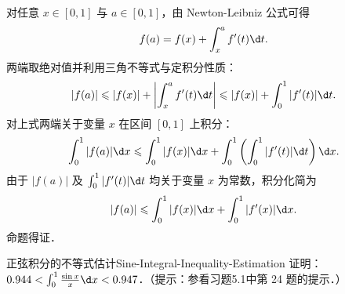 \begin{myproof}
    对任意 $x \in [0, 1]$ 与 $a \in [0, 1]$，由 Newton-Leibniz 公式可得
    \begin{equation}
        f(a) = f(x) + \int_x^a f'(t)\d t.
    \end{equation}
    两端取绝对值并利用三角不等式与定积分性质：
    \begin{equation}
        |f(a)| \leqslant |f(x)| + \left| \int_x^a f'(t)\d t \right| \leqslant |f(x)| + \int_0^1 |f'(t)|\d t.
    \end{equation}
    对上式两端关于变量 $x$ 在区间 $[0, 1]$ 上积分：
    \begin{equation}
        \int_0^1 |f(a)| \d x \leqslant \int_0^1 |f(x)| \d x + \int_0^1 \left( \int_0^1 |f'(t)|\d t \right) \d x.
    \end{equation}
    由于 $|f(a)|$ 及 $\int_0^1 |f'(t)|\d t$ 均关于变量 $x$ 为常数，积分化简为
    \begin{equation}
        |f(a)| \leqslant \int_0^1 |f(x)| \d x + \int_0^1 |f'(x)| \d x.
    \end{equation}
    命题得证．
\end{myproof}

\begin{problem}{正弦积分的不等式估计}{Sine-Integral-Inequality-Estimation}
    证明：$0.944 < \int_0^1 \frac{\sin x}{x} \d x < 0.947$．（提示：参看习题5.1中第 24 题的提示．）
\end{problem}

